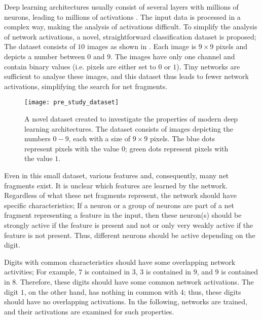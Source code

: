 Deep learning architectures usually consist of several layers with millions of neurons, leading to millions of activations \cite{Szegedy_Liu_Jia_Sermanet_Reed_Anguelov_Erhan_Vanhoucke_Rabinovich_2014, He_Zhang_Ren_Sun_2016, Ronneberger_Fischer_Brox_2015, He_Gkioxari_Dollar_Girshick_2017, Liu_Anguelov_Erhan_Szegedy_Reed_Fu_Berg_2016, Redmon_Divvala_Girshick_Farhadi_2016}.
The input data is processed in a complex way, making the analysis of activations difficult.
To simplify the analysis of network activations, a novel, straightforward classification dataset is proposed;
The dataset consists of $10$ images as shown in .
Each image is $9\times9$ pixels and depicts a number between $0$ and $9$.
The images have only one channel and contain binary values (i.e. pixels are either set to $0$ or $1$).
Tiny networks are sufficient to analyse these images, and this dataset thus leads to fewer network activations, simplifying the search for net fragments.

\begin{figure}[h]
    \centering
    \texttt{[image: pre\_study\_dataset]}
    \caption[Straight line digits dataset]{A novel dataset created to investigate the properties of modern deep learning architectures. The dataset consists of images depicting the numbers $0-9$, each with a size of $9\times9$ pixels. The blue dots represent pixels with the value $0$; green dots represent pixels with the value $1$.}
\end{figure}

Even in this small dataset, various features and, consequently, many net fragments exist.
It is unclear which features are learned by the network.
Regardless of what these net fragments represent, the network should have specific characteristics;
If a neuron or a group of neurons are part of a net fragment representing a feature in the input, then these neuron(s) should be strongly active if the feature is present and not or only very weakly active if the feature is not present.
Thus, different neurons should be active depending on the digit.

Digits with common characteristics should have some overlapping network activities;
For example, $7$ is contained in $3$, $3$ is contained in $9$, and $9$ is contained in $8$.
Therefore, these digits should have some common network activations.
The digit $1$, on the other hand, has nothing in common with $4$; thus, these digits should have no overlapping activations.
In the following, networks are trained, and their activations are examined for such properties.

